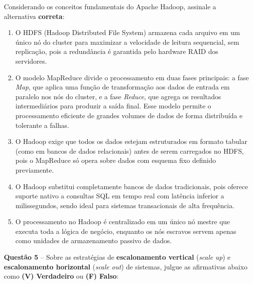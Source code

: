 \documentclass[12pt,a4paper]{article}
\begin{document}
\vspace{0.2cm}

Considerando os conceitos fundamentais do Apache Hadoop, assinale a alternativa \textbf{correta}:

\vspace{0.3cm}

\begin{enumerate}[label=\textbf{(\Alph*)}]
    \item O HDFS (Hadoop Distributed File System) armazena cada arquivo em um único nó do cluster para maximizar a velocidade de leitura sequencial, sem replicação, pois a redundância é garantida pelo hardware RAID dos servidores.

    \item O modelo MapReduce divide o processamento em duas fases principais: a fase \textit{Map}, que aplica uma função de transformação aos dados de entrada em paralelo nos nós do cluster, e a fase \textit{Reduce}, que agrega os resultados intermediários para produzir a saída final. Esse modelo permite o processamento eficiente de grandes volumes de dados de forma distribuída e tolerante a falhas.

    \item O Hadoop exige que todos os dados estejam estruturados em formato tabular (como em bancos de dados relacionais) antes de serem carregados no HDFS, pois o MapReduce só opera sobre dados com esquema fixo definido previamente.

    \item O Hadoop substitui completamente bancos de dados tradicionais, pois oferece suporte nativo a consultas SQL em tempo real com latência inferior a milissegundos, sendo ideal para sistemas transacionais de alta frequência.

    \item O processamento no Hadoop é centralizado em um único nó mestre que executa toda a lógica de negócio, enquanto os nós escravos servem apenas como unidades de armazenamento passivo de dados.
\end{enumerate}

\vspace{0.5cm}

\textbf{Questão 5} -- Sobre as estratégias de \textbf{escalonamento vertical} (\textit{scale up}) e \textbf{escalonamento horizontal} (\textit{scale out}) de sistemas, julgue as afirmativas abaixo como \textbf{(V) Verdadeiro} ou \textbf{(F) Falso}:
\end{document}
